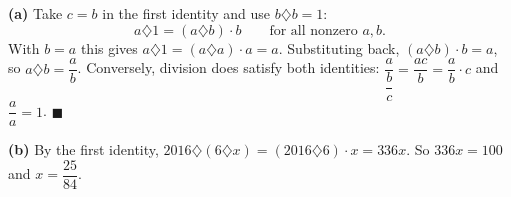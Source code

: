 \textbf{(a)} Take $c=b$ in the first identity and use $b\diamondsuit b=1$:
\[a\diamondsuit1=(a\diamondsuit b)\cdot b\qquad\text{for all nonzero }a,b.\]
With $b=a$ this gives $a\diamondsuit1=(a\diamondsuit a)\cdot a=a$. Substituting back, $(a\diamondsuit b)\cdot b=a$, so $a\diamondsuit b=\dfrac ab$. Conversely, division does satisfy both identities: $\dfrac{a}{\dfrac bc}=\dfrac{ac}{b}=\dfrac ab\cdot c$ and $\dfrac aa=1$. $\blacksquare$

\textbf{(b)} By the first identity, $2016\diamondsuit(6\diamondsuit x)=(2016\diamondsuit6)\cdot x=336x$. So $336x=100$ and $x=\boxed{\dfrac{25}{84}}$.
